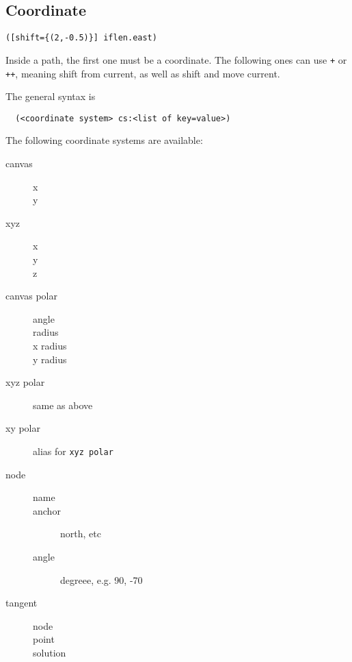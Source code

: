 \subsection{Coordinate}
\begin{lstlisting}
([shift={(2,-0.5)}] iflen.east)
\end{lstlisting}

Inside a path, the first one must be a coordinate. The following ones
can use \texttt{+} or \texttt{++}, meaning shift from current, as well
as shift and move current.

The general syntax is
\begin{lstlisting}
  (<coordinate system> cs:<list of key=value>)
\end{lstlisting}

The following coordinate systems are available:
\begin{description}
\item [canvas]
  \begin{description}
  \item [x]
  \item [y]
  \end{description}
\item [xyz]
  \begin{description}
  \item [x]
  \item [y]
  \item [z]
  \end{description}
\item [canvas polar]
  \begin{description}
  \item [angle]
  \item [radius]
  \item [x radius]
  \item [y radius]
  \end{description}
\item [xyz polar] same as above
\item [xy polar] alias for \texttt{xyz polar}
\item [node]
  \begin{description}
  \item [name]
  \item [anchor] north, etc
  \item [angle] degreee, e.g. 90, -70
  \end{description}
\item [tangent]
  \begin{description}
  \item [node]
  \item [point]
  \item [solution]
  \end{description}
\end{description}

